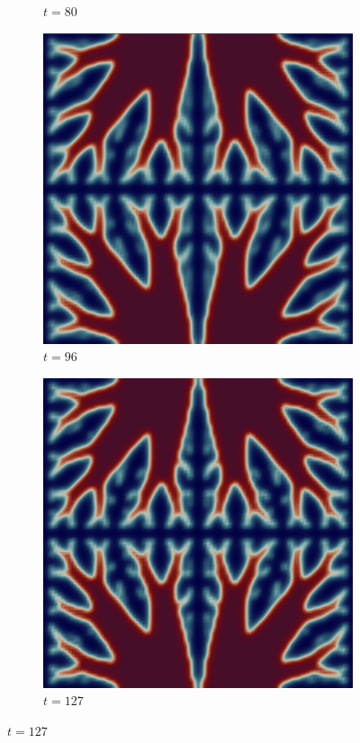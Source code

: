 \begin{figure}[H]
\begin{subfigure}{.4\textwidth}
        \caption{$t = 80$}
    \end{subfigure}
    \begin{subfigure}{.4\textwidth}
        \includegraphics[width=\textwidth]{imgs/UnitSquare2/seventh.png}
        \caption{$t = 96$}
    \end{subfigure}
    \begin{subfigure}{.4\textwidth}
        \includegraphics[width=\textwidth]{imgs/UnitSquare2/eighth.png}
        \caption{$t = 127$}
    \end{subfigure}
\end{figure}

